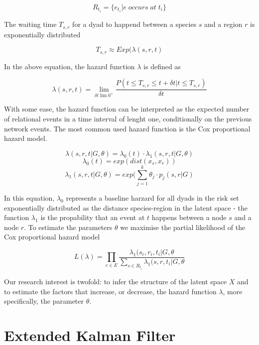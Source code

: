 \documentclass[mscthesis]{usiinfthesis}
\begin{document}
\[
R_{t_i} = \{e_{t_i} | e \; occurs \; at \; t_i\}
\]

The waiting time $T_{s,r}$ for a dyad to happend between a species $s$ and a region $r$ is exponentially distributed 

\[
T_{s,r} \approx Exp(\lambda(s, r, t)
\]


In the above equation, the hazard function $\lambda$ is defined as

\[
\lambda(s, r, t) = \lim_{\delta t \lim 0^+} \frac{P(t \leq T_{s,r} \leq t + \delta t | t \leq T_{s,r})}{\delta t}
\]

With some ease, the hazard function can be interpreted as the expected number of relational events in a time interval of lenght one, conditionally on the previous network events. The most common used hazard function is the Cox proportional hazard model. 


\[
\lambda(s, r, t|G, \theta) = \lambda_0(t) \cdot \lambda_1(s, r, t|G, \theta)
\]
\[
\lambda_0(t) =  exp(dist(x_s, x_r))
\]
\[
\lambda_1(s, r, t|G, \theta) = exp(\sum_{j=1}^k \theta_j \cdot p_j(s, r|G)
\]

In this equation, $\lambda_0$ represents a baseline harzard for all dyads in the risk set exponentially distributed as the distance species-region in the latent space - the function $\lambda_1$ is the propability that an event at $t$ happens between a node $s$ and a node $r$. To estimate the parameters $\theta$ we maximise the partial likelihood of the Cox proportional hazard model 

\[
L(\lambda) =  \prod_{e \in E} \frac{\lambda_1(s_i, r_i, t_i | G, \theta}{ \sum_{s \in R_{t_i}} \lambda_1(s, r, t_i | G, \theta}
\]

Our research interest is twofold: to infer the structure of the latent space $X$ and to estimate the factors that increase, or decrease, the hazard function $\lambda$, more specifically, the parameter $\theta$.


\section{Extended Kalman Filter}
\end{document}
